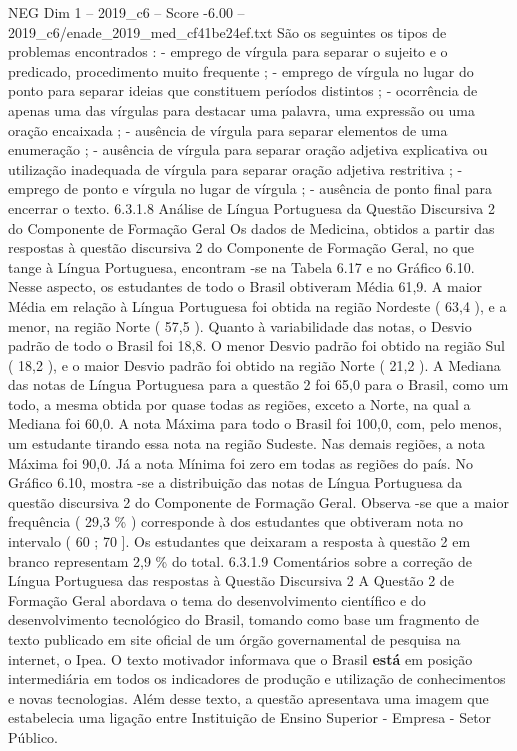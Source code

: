 \begin{textsample}{NEG Dim 1 – 2019\_c6 – Score -6.00 – 2019\_c6/enade\_2019\_med\_cf41be24ef.txt}
São os seguintes os tipos de problemas encontrados : - emprego de vírgula para separar o sujeito e o predicado, procedimento muito frequente ; - emprego de vírgula no lugar do ponto para separar ideias que constituem períodos distintos ; - ocorrência de apenas uma das vírgulas para destacar uma palavra, uma expressão ou uma oração encaixada ; - ausência de vírgula para separar elementos de uma enumeração ; - ausência de vírgula para separar oração adjetiva explicativa ou utilização inadequada de vírgula para separar oração adjetiva restritiva ; - emprego de ponto e vírgula no lugar de vírgula ; - ausência de ponto final para encerrar o texto. 6.3.1.8 Análise de Língua Portuguesa da Questão Discursiva 2 do Componente de Formação Geral Os dados de Medicina, obtidos a partir das respostas à questão discursiva 2 do Componente de Formação Geral, no que tange à Língua Portuguesa, encontram -se na Tabela 6.17 e no Gráfico 6.10.
Nesse aspecto, os estudantes de todo o Brasil obtiveram Média 61,9.
A maior Média em relação à Língua Portuguesa foi obtida na região Nordeste ( 63,4 ), e a menor, na região Norte ( 57,5 ).
Quanto à variabilidade das notas, o Desvio padrão de todo o Brasil foi 18,8.
O menor Desvio padrão foi obtido na região Sul ( 18,2 ), e o maior Desvio padrão foi obtido na região Norte ( 21,2 ).
A Mediana das notas de Língua Portuguesa para a questão 2 foi 65,0 para o Brasil, como um todo, a mesma obtida por quase todas as regiões, exceto a Norte, na qual a Mediana foi 60,0.
A nota Máxima para todo o Brasil foi 100,0, com, pelo menos, um estudante tirando essa nota na região Sudeste.
Nas demais regiões, a nota Máxima foi 90,0.
Já a nota Mínima foi zero em todas as regiões do país.
No Gráfico 6.10, mostra -se a distribuição das notas de Língua Portuguesa da questão discursiva 2 do Componente de Formação Geral.
Observa -se que a maior frequência ( 29,3 \% ) corresponde à dos estudantes que obtiveram nota no intervalo ( 60 ; 70 ].
Os estudantes que deixaram a resposta à questão 2 em branco representam 2,9 \% do total. 6.3.1.9 Comentários sobre a correção de Língua Portuguesa das respostas à Questão Discursiva 2 A Questão 2 de Formação Geral abordava o tema do desenvolvimento científico e do desenvolvimento tecnológico do Brasil, tomando como base um fragmento de texto publicado em site oficial de um órgão governamental de pesquisa na internet, o Ipea.
O texto motivador informava que o Brasil \textbf{está} em posição intermediária em todos os indicadores de produção e utilização de conhecimentos e novas tecnologias.
Além desse texto, a questão apresentava uma imagem que estabelecia uma ligação entre Instituição de Ensino Superior - Empresa - Setor Público.

\end{textsample}
